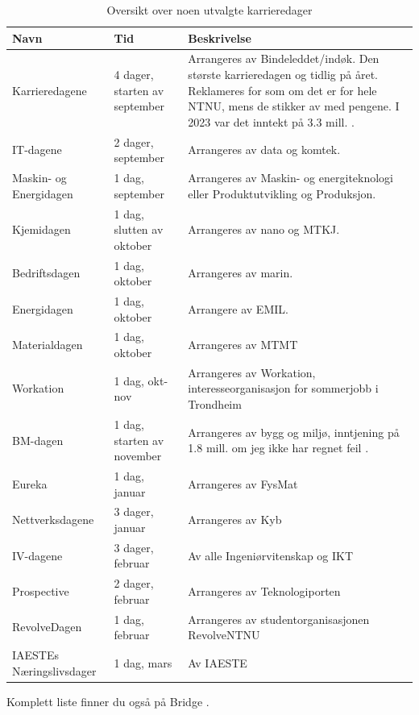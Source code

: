 \begin{table}[H]
    \centering
    \begin{tabular}{p{2cm}p{3cm}p{7cm}}
        \toprule
        Navn & Tid & Beskrivelse \\
        \midrule
         Karrieredagene & 4 dager, starten av september & Arrangeres av Bindeleddet/indøk. Den største karrieredagen og tidlig på året. Reklameres for som om det er for hele NTNU, mens de stikker av med pengene. I 2023 var det inntekt på 3.3 mill. \cite{underdusken_tjora_karrieredagen}. \\
         IT-dagene & 2 dager, september & Arrangeres av data og komtek. \\
         Maskin- og Energidagen & 1 dag, september & Arrangeres av Maskin- og energiteknologi eller Produktutvikling og Produksjon. \\
         Kjemidagen & 1 dag, slutten av oktober & Arrangeres av nano og MTKJ. \\
         Bedriftsdagen & 1 dag, oktober & Arrangeres av marin. \\
         Energidagen & 1 dag, oktober & Arrangere av EMIL. \\
         Materialdagen & 1 dag, oktober & Arrangeres av MTMT \\
         Workation & 1 dag, okt-nov & Arrangeres av Workation, interesseorganisasjon for sommerjobb i Trondheim \\
         BM-dagen & 1 dag, starten av november & Arrangeres av bygg og miljø, inntjening på 1.8 mill. om jeg ikke har regnet feil \cite{bm_dagen_2023}. \\
         Eureka & 1 dag, januar & Arrangeres av FysMat \\
         Nettverksdagene & 3 dager, januar & Arrangeres av Kyb \\
         IV-dagene & 3 dager, februar & Av alle Ingeniørvitenskap og IKT \\
         Prospective & 2 dager, februar & Arrangeres av Teknologiporten \\
         RevolveDagen & 1 dag, februar & Arrangeres av studentorganisasjonen RevolveNTNU \\
         IAESTEs Næringslivsdager & 1 dag, mars & Av IAESTE \\
        \bottomrule
    \end{tabular}
    \caption{Oversikt over noen utvalgte karrieredager}
    \label{tab:Casekonkurranser}
\end{table}

Komplett liste finner du også på Bridge \cite{ntnu_bridge_career_days}.




